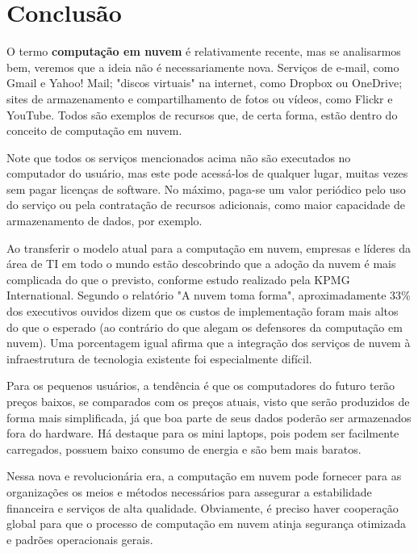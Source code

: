 \section{Conclusão}

O termo \textbf{computação em nuvem} é relativamente recente, mas se analisarmos bem,
veremos que a ideia não é necessariamente nova. Serviços de e-mail, como Gmail e
Yahoo! Mail; "discos virtuais" na internet, como Dropbox ou OneDrive; sites de
armazenamento e compartilhamento de fotos ou vídeos, como Flickr e YouTube. Todos são
exemplos de recursos que, de certa forma, estão dentro do conceito de computação em
nuvem.

Note que todos os serviços mencionados acima não são executados no computador do
usuário, mas este pode acessá-los de qualquer lugar, muitas vezes sem pagar licenças
de software. No máximo, paga-se um valor periódico pelo uso do serviço ou pela
contratação de recursos adicionais, como maior capacidade de armazenamento de dados,
por exemplo.

Ao transferir o modelo atual para a computação em nuvem, empresas e líderes da área
de TI em todo o mundo estão descobrindo que a adoção da nuvem é mais complicada do
que o previsto, conforme estudo realizado pela KPMG International. Segundo o
relatório "A nuvem toma forma", aproximadamente 33\% dos executivos ouvidos dizem
que os custos de implementação foram mais altos do que o esperado (ao contrário do
que alegam os defensores da computação em nuvem). Uma porcentagem igual afirma que
a integração dos serviços de nuvem à infraestrutura de tecnologia existente foi
especialmente difícil.

Para os pequenos usuários, a tendência é que os computadores do futuro terão preços
baixos, se comparados com os preços atuais, visto que serão produzidos de forma mais
simplificada, já que boa parte de seus dados poderão ser armazenados fora do
hardware. Há destaque para os mini laptops, pois podem ser facilmente carregados,
possuem baixo consumo de energia e são bem mais baratos.

Nessa nova e revolucionária era, a computação em nuvem pode fornecer para as
organizações os meios e métodos necessários para assegurar a estabilidade
financeira e serviços de alta qualidade. Obviamente, é preciso haver cooperação
global para que o processo de computação em nuvem atinja segurança otimizada e
padrões operacionais gerais. 
